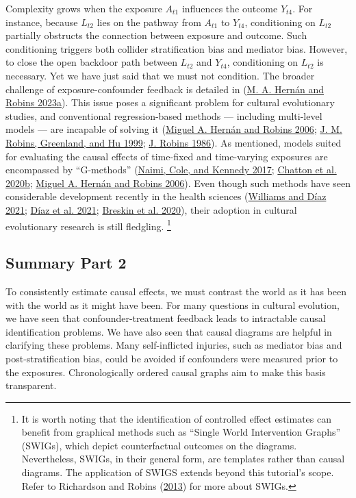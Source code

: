 \documentclass[
  singlecolumn]{report}
\begin{document}
Complexity grows when the exposure \(A_{t1}\) influences the outcome
\(Y_{t4}\). For instance, because \(L_{t2}\) lies on the pathway from
\(A_{t1}\) to \(Y_{t4}\), conditioning on \(L_{t2}\) partially obstructs
the connection between exposure and outcome. Such conditioning triggers
both collider stratification bias and mediator bias. However, to close
the open backdoor path between \(L_{t2}\) and \(Y_{t4}\), conditioning
on \(L_{t2}\) is necessary. Yet we have just said that we must not
condition. The broader challenge of exposure-confounder feedback is
detailed in (\protect\hyperlink{ref-hernuxe1n2023a}{M. A. Hernán and
Robins 2023a}). This issue poses a significant problem for cultural
evolutionary studies, and conventional regression-based methods ---
including multi-level models --- are incapable of solving it
(\protect\hyperlink{ref-hernuxe1n2006}{Miguel A. Hernán and Robins
2006}; \protect\hyperlink{ref-robins1999}{J. M. Robins, Greenland, and
Hu 1999}; \protect\hyperlink{ref-robins1986}{J. Robins 1986}). As
mentioned, models suited for evaluating the causal effects of time-fixed
and time-varying exposures are encompassed by ``G-methods''
(\protect\hyperlink{ref-naimi2017}{Naimi, Cole, and Kennedy 2017};
\protect\hyperlink{ref-chatton2020}{Chatton et al. 2020b};
\protect\hyperlink{ref-hernuxe1n2006}{Miguel A. Hernán and Robins
2006}). Even though such methods have seen considerable development
recently in the health sciences
(\protect\hyperlink{ref-williams2021}{Williams and Díaz 2021};
\protect\hyperlink{ref-duxedaz2021}{Díaz et al. 2021};
\protect\hyperlink{ref-breskin2020}{Breskin et al. 2020}), their
adoption in cultural evolutionary research is still fledgling.
\footnote{It is worth noting that the identification of controlled
  effect estimates can benefit from graphical methods such as ``Single
  World Intervention Graphs'' (SWIGs), which depict counterfactual
  outcomes on the diagrams. Nevertheless, SWIGs, in their general form,
  are templates rather than causal diagrams. The application of SWIGS
  extends beyond this tutorial's scope. Refer to Richardson and Robins
  (\protect\hyperlink{ref-richardson2013}{2013}) for more about SWIGs.}

\hypertarget{summary-part-2}{%
\subsection{Summary Part 2}\label{summary-part-2}}

To consistently estimate causal effects, we must contrast the world as
it has been with the world as it might have been. For many questions in
cultural evolution, we have seen that confounder-treatment feedback
leads to intractable causal identification problems. We have also seen
that causal diagrams are helpful in clarifying these problems. Many
self-inflicted injuries, such as mediator bias and post-stratification
bias, could be avoided if confounders were measured prior to the
exposures. Chronologically ordered causal graphs aim to make this basis
transparent.
\end{document}

